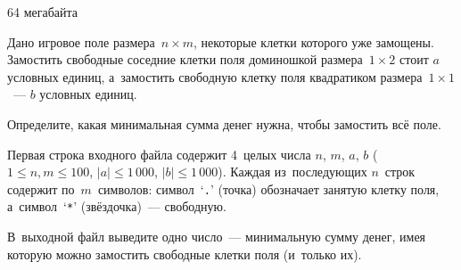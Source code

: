 
{64 мегабайта}

Дано игровое поле размера~$n \times m$, некоторые клетки которого уже замощены.
Замостить свободные соседние клетки поля доминошкой размера~$1 \times 2$ стоит $a$ условных единиц, а~замостить свободную клетку поля квадратиком размера~$1 \times 1$~--- $b$ условных единиц.

Определите, какая минимальная сумма денег нужна, чтобы замостить всё поле.

\InputFile
Первая строка входного файла содержит 4~целых числа $n$, $m$, $a$, $b$ ($1 \leqslant n, m \leqslant 100$, $|a| \leqslant 1\,000$, $|b| \leqslant 1\,000$). 
Каждая из~последующих $n$~строк содержит по~$m$~символов: символ~‘\verb"."’ (точка) обозначает занятую клетку поля, а~символ~‘\verb"*"’ (звёздочка)~--- свободную.

\OutputFile
В~выходной файл выведите одно число~--- минимальную сумму денег, имея которую можно замостить свободные клетки поля (и~только их).


